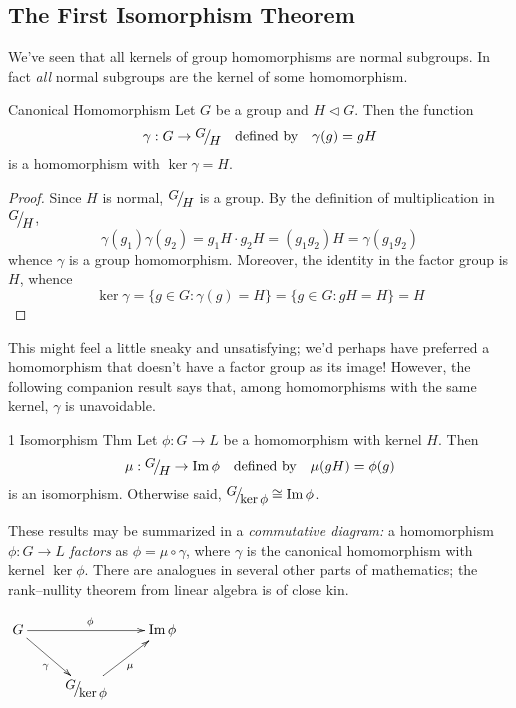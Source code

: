 \clearpage



\subsection{The First Isomorphism Theorem}\label{sec:1stiso}

We've seen that all kernels of group homomorphisms are normal subgroups. In fact \emph{all} normal subgroups are the kernel of some homomorphism.

\begin{thm}{Canonical Homomorphism}{}
	Let $G$ be a group and $H\triangleleft G$. Then the function
	\[
		\gamma:G\to \quotient GH
		\quad\text{defined by}\quad 
		\gamma(g)=gH
	\]
	is a homomorphism with $\ker\gamma=H$.
\end{thm}

\begin{proof}
	Since $H$ is normal, $\quotient GH$ is a group. By the definition of multiplication in $\quotient GH$,
	\[
		\gamma(g_1)\gamma(g_2)
		=g_1H\cdot g_2H
		=(g_1g_2)H
		=\gamma(g_1g_2)
	\]
	whence $\gamma$ is a group homomorphism. Moreover, the identity in the factor group is $H$, whence
	\[
		\ker\gamma=\{g\in G:\gamma(g)=H\} 
		=\{g\in G:gH=H\}=H
		\tag*{\qedhere}
	\]
\end{proof}

This might feel a little sneaky and unsatisfying; we'd perhaps have preferred a homomorphism that doesn't have a factor group as its image! However, the following companion result says that, among homomorphisms with the same kernel, $\gamma$ is unavoidable.

\begin{thm}{1\st{} Isomorphism Thm}{}
	Let $\phi:G\to L$ be a homomorphism with kernel $H$. Then
	\[
		\mu:\quotient GH\to\image\phi
		\quad \text{defined by}\quad 
		\mu(gH)=\phi(g)
	\]
	is an isomorphism. Otherwise said, $\quotient G{\ker\phi}\cong\image\phi$.
\end{thm}


\begin{minipage}[t]{0.69\linewidth}
	These results may be summarized in a \emph{commutative diagram:} a homomorphism $\phi:G\to L$ \emph{factors} as $\phi=\mu\circ\gamma$, where $\gamma$ is the canonical homomorphism with kernel $\ker\phi$. There are analogues in several other parts of mathematics; the rank--nullity theorem from linear algebra is of close kin.
\end{minipage}
\hfill
\begin{minipage}[t]{0.3\linewidth}
	\flushright$\xymatrix{%
		G \ar[rr]^{\phi} \ar[dr]_\gamma && \image\phi\\
		& \quotient G{\ker\phi} \ar[ur]_{\mu} &
	}$
\end{minipage}



